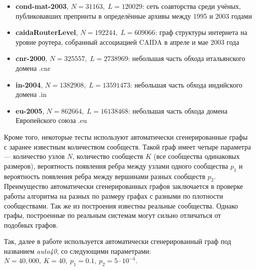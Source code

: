 \begin{itemize}
	\item \textbf{cond-mat-2003}, $N = 31163,\;L = 120029$: сеть соавторства среди учёных, публиковавших препринты в определённые архивы между 1995 и 2003 годами \cite{Newman:2001}
	\item \textbf{caidaRouterLevel}, $N = 192244,\;L =  609066$: граф структуры интернета на уровне роутера, собранный ассоциацией CAIDA в апреле и мае 2003 года
	\item \textbf{cnr-2000}, $N = 325557,\;L = 2738969$: небольшая часть обхода итальянского домена .cnr \cite{Boldi&Vigna:2004, Boldi&al:2011, Boldi&al:2004}
	\item \textbf{in-2004}, $N = 1382908,\;L = 13591473$: небольшая часть обхода индийского домена .in \cite{Boldi&Vigna:2004, Boldi&al:2011, Boldi&al:2004}
	\item \textbf{eu-2005}, $N = 862664,\;L = 16138468$: небольшая часть обхода домена Европейского союза .eu \cite{Boldi&Vigna:2004, Boldi&al:2011, Boldi&al:2004}

\end{itemize}

Кроме того, некоторые тесты используют автоматически сгенерированные графы с заранее известным количеством сообществ. Такой граф имеет четыре параметра --- количество узлов $N$, количество сообществ $K$ (все сообщества одинаковых размеров), вероятность появления ребра между узлами одного сообщества $p_1$ и вероятность появления ребра между вершинами разных сообществ $p_2$. Преимущество автоматически сгенерированных графов заключается в проверке работы алгоритма на разных по размеру графах с разными по плотности сообществами. Так же из построения известны реальные сообщества. Однако графы, построенные по реальным системам могут сильно отличаться от подобных графов.

Так, далее в работе используется автоматически сгенерированный граф под названием \emph{auto40}, со следующими параметрами: $N = 40,000,\ K = 40,\ p_1 = 0.1,\ p_2 = 5\cdot 10^{-4}$.